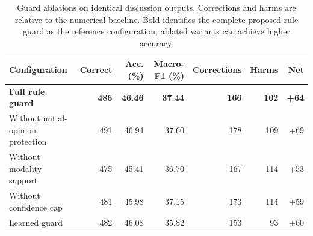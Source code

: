 \begin{table}[pos=t]
\caption{Guard ablations on identical discussion outputs. Corrections and harms are relative to the numerical baseline. Bold identifies the complete proposed rule guard as the reference configuration; ablated variants can achieve higher accuracy.}
\label{tab:results_ablation}
\centering\small
\begin{tabular}{@{}lrrrrrr@{}}
\toprule
Configuration & Correct & Acc. (\%) & Macro-F1 (\%) & Corrections & Harms & Net \\
\midrule
\textbf{Full rule guard} & \textbf{486} & \textbf{46.46} & \textbf{37.44} & \textbf{166} & \textbf{102} & \textbf{+64} \\
Without initial-opinion protection & 491 & 46.94 & 37.60 & 178 & 109 & +69 \\
Without modality support & 475 & 45.41 & 36.70 & 167 & 114 & +53 \\
Without confidence cap & 481 & 45.98 & 37.15 & 173 & 114 & +59 \\
Learned guard & 482 & 46.08 & 35.82 & 153 & 93 & +60 \\
\bottomrule
\end{tabular}
\end{table}
